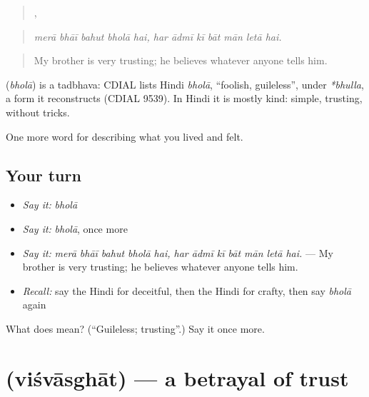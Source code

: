 \begin{quote}
    ,       
\end{quote}

\begin{quote}
\emph{merā bhāī bahut bholā hai, har ādmī kī bāt mān letā hai.}
\end{quote}

\begin{quote}
My brother is very trusting; he believes whatever anyone tells him.
\end{quote}

\begin{cousinweb}
\textbf{} (\emph{bholā}) is a tadbhava: CDIAL lists Hindi \emph{bholā}, \textquotedblleft{}foolish, guileless\textquotedblright{}, under \emph{*bhulla}, a form it reconstructs (CDIAL 9539). In Hindi it is mostly kind: simple, trusting, without tricks.
\end{cousinweb}

\begin{grammarlens}[title={What you've built}]
One more word for describing what you lived and felt.
\end{grammarlens}

\subsection*{Your turn}
\begin{itemize}
\raggedright
  \item \emph{Say it:} \emph{bholā}
  \item \emph{Say it:} \emph{bholā}, once more
  \item \emph{Say it:} \emph{merā bhāī bahut bholā hai, har ādmī kī bāt mān letā hai.} — My brother is very trusting; he believes whatever anyone tells him.
  \item \emph{Recall:} say the Hindi for deceitful, then the Hindi for crafty, then say \emph{bholā} again
\end{itemize}

\begin{tcolorbox}[breakable,colback=teal!4,colframe=teal!35!black,title={Before you move on}]
What does  mean? (\textquotedblleft{}Guileless; trusting\textquotedblright{}.) Say it once more.
\end{tcolorbox}
\section[\texorpdfstring{\hi{विश्वासघात} (viśvāsghāt)}{विश्वासघात (viśvāsghāt)}]{ (viśvāsghāt) — a betrayal of trust}

